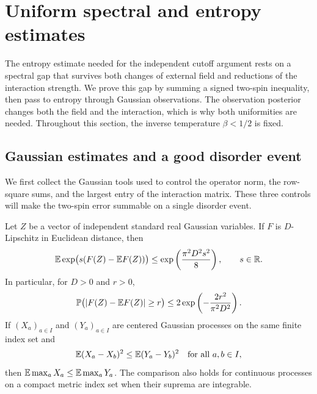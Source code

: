 \section{Uniform spectral and entropy estimates}
\label{rcut:sec:entropy}

The entropy estimate needed for the independent cutoff argument rests on a
spectral gap that survives both changes of external field and reductions of
the interaction strength.  We prove this gap by summing a signed two-spin
inequality, then pass to entropy through Gaussian observations.  The observation
posterior changes both the field and the interaction, which is why both
uniformities are needed.  Throughout this section, the inverse temperature
$\beta<1/2$ is fixed.

\subsection{Gaussian estimates and a good disorder event}

We first collect the Gaussian tools used to control the operator norm, the
row-square sums, and the largest entry of the interaction matrix.  These three
controls will make the two-spin error summable on a single disorder event.

\begin{lemma}
\label{rcut:lem:gaussian-facts}
Let $Z$ be a vector of independent standard real Gaussian variables.
If $F$ is $D$-Lipschitz in Euclidean distance, then
\begin{equation}
 \mathbb E\exp\bigl(s(F(Z)-\mathbb E F(Z))\bigr)
 \le \exp\left(\frac{\pi^2D^2s^2}{8}\right),
 \qquad s\in\mathbb R.
 \label{rcut:eq:gaussian-mgf}
\end{equation}
In particular, for $D>0$ and $r>0$,
\[
 \mathbb P\bigl(|F(Z)-\mathbb E F(Z)|\ge r\bigr)
 \le 2\exp\left(-\frac{2r^2}{\pi^2D^2}\right).
\]
If $(X_a)_{a\in I}$ and $(Y_a)_{a\in I}$ are centered Gaussian processes on
the same finite index set and
\[
 \mathbb E(X_a-X_b)^2\le \mathbb E(Y_a-Y_b)^2
 \quad\text{for all }a,b\in I,
\]
then $\mathbb E\max_a X_a\le\mathbb E\max_a Y_a$.
The comparison also holds for continuous processes on a compact metric index
set when their suprema are integrable.
\end{lemma}

